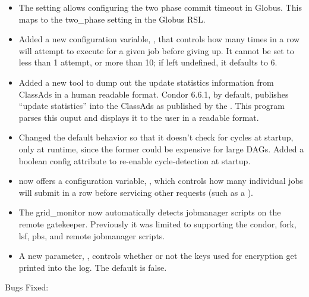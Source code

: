 \begin{itemize}

\item The setting  allows
   configuring the two phase commit timeout in Globus.  This maps to the
   two\_phase setting in the Globus RSL.

\item Added a new configuration variable,
      , that controls how many
      times in a row  will attempt to execute
       for a given job before giving up.  It cannot be
      set to less than 1 attempt, or more than 10; if left undefined,
      it defaults to 6.

\item Added a new tool  to dump out the update
statistics information from ClassAds in a human readable format.
Condor 6.6.1, by default, publishes ``update statistics'' into the
ClassAds as published by the .  This program parses
this ouput and displays it to the user in a readable format.

\item Changed the default  behavior so that it doesn't
      check for cycles at startup, only at runtime, since the former
      could be expensive for large DAGs.  Added a boolean
       config attribute to
      re-enable cycle-detection at startup.

\item {} now offers a configuration variable,
      , which controls how
      many individual jobs  will submit in a row before
      servicing other requests (such as a ).

\item The grid\_monitor now automatically detects jobmanager scripts on the
      remote gatekeeper.  Previously it was limited to supporting the condor,
	  fork, lsf, pbs, and remote jobmanager scripts.

\item A new parameter, , controls whether or not
      the keys used for encryption get printed into the log.
	  The default is false.


\end{itemize}

\noindent Bugs Fixed:

